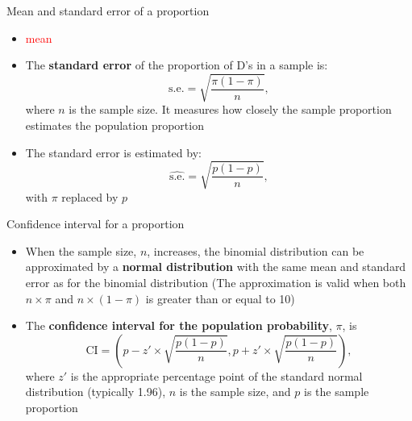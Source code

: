 \documentclass[compress, notes=hide]{beamer}
\newcommand{\hl}[1]{\textbf{#1}}
\begin{document}

\begin{frame}
	\begin{block}{Mean and standard error of a proportion}
		\begin{itemize}
			\item \textcolor{red}{mean}
			\item The \hl{standard error} of the proportion of D's in a sample is:
			\begin{equation}
				\text{s.e.} = \sqrt{ \frac{\pi (1 - \pi)}{n}},\nonumber
			\end{equation}
			where $n$ is the sample size. It measures how closely the sample
			proportion estimates the population proportion
			\item The standard error is estimated by:
			\begin{equation}
				\widehat{\text{s.e.}} = \sqrt{ \frac{p (1 - p)}{n}},\nonumber
			\end{equation}
			with $\pi$ replaced by $p$
		\end{itemize}
	\end{block}
\end{frame}



\begin{frame}
\begin{block}{Confidence interval for a proportion}
\begin{itemize}
	\item When the sample size, $n$, increases, the binomial distribution
	can be approximated by a \hl{normal distribution} with the same
	mean and standard error as for the binomial distribution (The approximation is valid when both $n \times	\pi$ and $n \times (1 - \pi)$ is greater than or equal to 10)
	\item The \hl{confidence interval for the population probability}, $\pi$, is
\begin{equation}
\text{CI} = \left( p - z' \times \sqrt{\frac{p(1-p)}{n}},p + z' \times \sqrt{\frac{p(1-p)}{n}} \right),\nonumber
\end{equation}
where $z'$ is the appropriate percentage point of the standard normal
distribution (typically 1.96), $n$ is the sample size, and $p$ is the
sample proportion
\end{itemize}
\end{block}
\end{frame}
\end{document}
